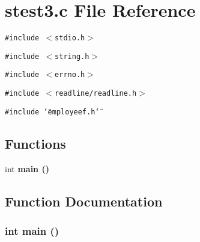 \section{stest3.c File Reference}
\label{stest3_8c}
{\tt \#include $<$stdio.h$>$}\par
{\tt \#include $<$string.h$>$}\par
{\tt \#include $<$errno.h$>$}\par
{\tt \#include $<$readline/readline.h$>$}\par
{\tt \#include \char`\"{}employeef.h\char`\"{}}\par
\subsection*{Functions}
\begin{CompactItemize}
\item 
int \bf{main} ()
\end{CompactItemize}


\subsection{Function Documentation}
\subsubsection{\setlength{\rightskip}{0pt plus 5cm}int main ()}\label{stest3_8c_446c6b9a1a4dbab517fbb760870458a3}


